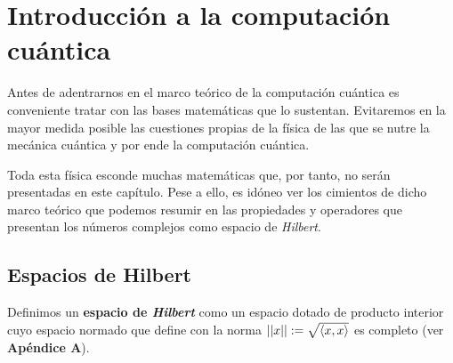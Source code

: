 \chapter{Introducción a la computación cuántica}

Antes de adentrarnos en el marco teórico de la computación cuántica es conveniente tratar con las bases matemáticas que lo sustentan. Evitaremos en la mayor medida posible las cuestiones propias de la física de las que se nutre la mecánica cuántica y por ende la computación cuántica.

Toda esta física esconde muchas matemáticas que, por tanto, no serán presentadas en este capítulo. Pese a ello, es idóneo ver los cimientos de dicho marco teórico que podemos resumir en las propiedades y operadores que presentan los números complejos como espacio de \textit{Hilbert}.

\section{Espacios de Hilbert}
\begin{definition} Definimos un \textbf{espacio de \textit{Hilbert}} como un espacio dotado de producto interior cuyo espacio normado que define con la norma $\left|\left|x\right|\right|:=\sqrt{\langle x,x\rangle}$ es completo (ver \textbf{Apéndice A}).
\end{definition}

